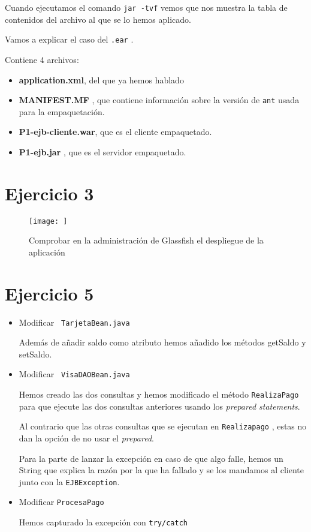 \documentclass[a4paper, 10pt]{article}
\begin{document}
 Cuando ejecutamos el comando \texttt{jar -tvf} vemos que nos muestra la tabla de contenidos del archivo al que se lo hemos aplicado.
 
 Vamos a explicar el caso del \texttt{.ear} .
 
 Contiene 4 archivos:
 \begin{itemize}
 	\item \textbf{application.xml}, del que ya hemos hablado
 	\item \textbf{MANIFEST.MF} , que contiene información sobre la versión de \texttt{ant} usada para la empaquetación.
 	\item \textbf{P1-ejb-cliente.war}, que es el cliente empaquetado.
 	\item \textbf{P1-ejb.jar} , que es el servidor empaquetado.
 \end{itemize} 
 
 \section{Ejercicio 3}
 
 \begin{figure}[hbtp]
 	\centering
 	\texttt{[image: ]}
 	\caption{Comprobar en la administración de Glassfish el despliegue de la aplicación}
 \end{figure}
 
 \section{Ejercicio 5}
 \begin{itemize}
 	\item Modificar \texttt{ TarjetaBean.java}
 	
 	
 	 Además de añadir saldo como atributo hemos añadido los métodos getSaldo y setSaldo.
 	 
 	 
 	 \item Modificar \texttt{ VisaDAOBean.java}
 	 
 	 
 	 Hemos creado las dos consultas y hemos modificado el método \texttt{RealizaPago} para que ejecute las dos consultas anteriores usando los \textit{prepared statements}.
 	 
 	 Al contrario que las otras consultas que se ejecutan en \texttt{Realizapago} , estas no dan la opción de no usar el \textit{prepared}.
 	 
 	 
 	 Para la parte de lanzar la excepción en caso de que algo falle, hemos un String que explica la razón por la que ha fallado y se los mandamos al cliente junto con la \texttt{EJBException}.
 	 
 	 \item Modificar \texttt{ProcesaPago}
 	 
 	 Hemos capturado la excepción con \texttt{try/catch}
 \end{itemize}
 
\end{document}
